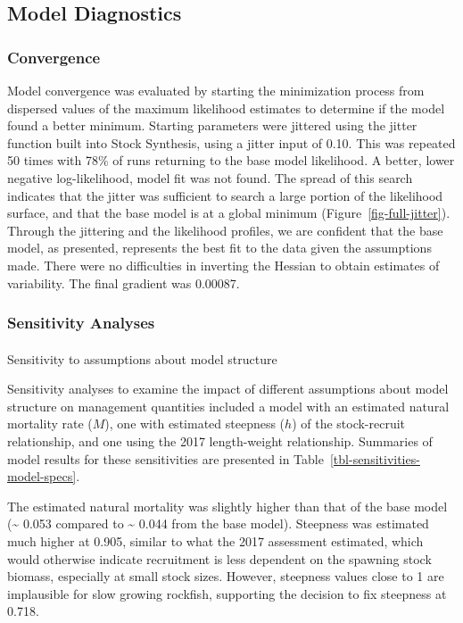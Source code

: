 \documentclass[
]{scrartcl}
\makeatletter
\let\oldparagraph\paragraph
\renewcommand{\paragraph}{
    \@ifstar
      \xxxParagraphStar
      \xxxParagraphNoStar
  }
\newcommand{\xxxParagraphStar}[1]{\oldparagraph*{#1}\mbox{}}
\newcommand{\xxxParagraphNoStar}[1]{\oldparagraph{#1}\mbox{}}
\makeatother
\begin{document}
\subsection{Model Diagnostics}\label{model-diagnostics}

\subsubsection{Convergence}\label{convergence}

Model convergence was evaluated by starting the minimization process
from dispersed values of the maximum likelihood estimates to determine
if the model found a better minimum. Starting parameters were jittered
using the jitter function built into Stock Synthesis, using a jitter
input of 0.10. This was repeated 50 times with 78\% of runs returning to
the base model likelihood. A better, lower negative log-likelihood,
model fit was not found. The spread of this search indicates that the
jitter was sufficient to search a large portion of the likelihood
surface, and that the base model is at a global minimum
(Figure~\ref{fig-full-jitter}). Through the jittering and the likelihood
profiles, we are confident that the base model, as presented, represents
the best fit to the data given the assumptions made. There were no
difficulties in inverting the Hessian to obtain estimates of
variability. The final gradient was 0.00087.

\subsubsection{Sensitivity Analyses}\label{sensitivity-analyses}

\paragraph{Sensitivity to assumptions about model
structure}\label{sensitivity-to-assumptions-about-model-structure}

Sensitivity analyses to examine the impact of different assumptions
about model structure on management quantities included a model with an
estimated natural mortality rate (\(M\)), one with estimated steepness
(\(h\)) of the stock-recruit relationship, and one using the 2017
length-weight relationship. Summaries of model results for these
sensitivities are presented in
Table~\ref{tbl-sensitivities-model-specs}.

The estimated natural mortality was slightly higher than that of the
base model (\textasciitilde{} 0.053 compared to \textasciitilde{} 0.044
from the base model). Steepness was estimated much higher at 0.905,
similar to what the 2017 assessment estimated, which would otherwise
indicate recruitment is less dependent on the spawning stock biomass,
especially at small stock sizes. However, steepness values close to 1
are implausible for slow growing rockfish, supporting the decision to
fix steepness at 0.718.
\end{document}
